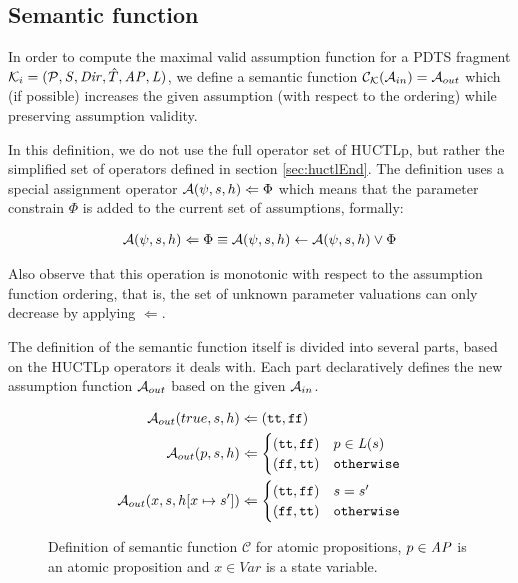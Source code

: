 \subsection{Semantic function}
\label{sec:semantic}

In order to compute the maximal valid assumption function for a \ac{PDTS} fragment $\mathcal{K}_i = (\mathcal{P}, \mathit{S}, \mathit{Dir}, \hat{T}, \mathit{AP}, \mathit{L})$, we define a semantic function $\mathcal{C}_\mathcal{K}(\mathcal{A}_{in}) = \mathcal{A}_{out}$ which (if possible) increases the given assumption (with respect to the ordering) while preserving assumption validity.

In this definition, we do not use the full operator set of \ac{HUCTLp}, but rather the simplified set of operators defined in section \ref{sec:huctlEnd}. The definition uses a special assignment operator $\mathcal{A}(\psi, s, h) \Leftarrow \Phi$ which means that the parameter constrain $\Phi$ is added to the current set of assumptions, formally:

\begin{align*}
	\mathcal{A}(\psi, s, h) \Leftarrow \Phi \equiv \mathcal{A}(\psi, s, h) \gets \mathcal{A}(\psi, s, h) \lor \Phi
\end{align*}

Also observe that this operation is monotonic with respect to the assumption function ordering, that is, the set of unknown parameter valuations can only decrease by applying $\Leftarrow$.

The definition of the semantic function itself is divided into several parts, based on the \ac{HUCTLp} operators it deals with. Each part declaratively defines the new assumption function $\mathcal{A}_{out}$ based on the given $\mathcal{A}_{in}$.

\begin{figure}
	\begin{align*}
	\mathcal{A}_{out}(true, s, h) & \Leftarrow (\texttt{tt}, \texttt{ff}) \\
	\mathcal{A}_{out}(p, s, h) & \Leftarrow 
	\begin{cases}
	(\texttt{tt}, \texttt{ff}) & p \in \mathit{L}(s) \\
	(\texttt{ff}, \texttt{tt}) & \texttt{otherwise} \\
	\end{cases}
	\\
	\mathcal{A}_{out}(x, s, h[ x \mapsto s' ]) & \Leftarrow
	\begin{cases}
	(\texttt{tt}, \texttt{ff}) & s = s' \\
	(\texttt{ff}, \texttt{tt}) & \texttt{otherwise}
	\end{cases}
	\\
	\end{align*}
	
	\caption{Definition of semantic function $\mathcal{C}$ for atomic propositions, $p \in \mathit{AP}$ is an atomic proposition and $x \in Var$ is a state variable.}
	\label{fig:assProp}
\end{figure}

